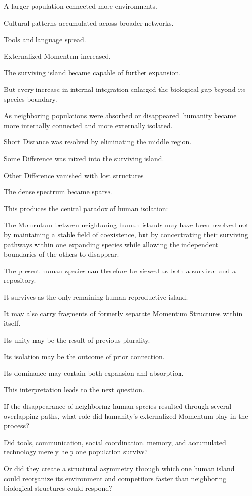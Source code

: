 A larger population connected more environments.

Cultural patterns accumulated across broader networks.

Tools and language spread.

Externalized Momentum increased.

The surviving island became capable of further expansion.

But every increase in internal integration enlarged the biological gap beyond its species boundary.

As neighboring populations were absorbed or disappeared, humanity became more internally connected and more externally isolated.

Short Distance was resolved by eliminating the middle region.

Some Difference was mixed into the surviving island.

Other Difference vanished with lost structures.

The dense spectrum became sparse.

This produces the central paradox of human isolation:

The Momentum between neighboring human islands may have been resolved not by maintaining a stable field of coexistence, but by concentrating their surviving pathways within one expanding species while allowing the independent boundaries of the others to disappear.

The present human species can therefore be viewed as both a survivor and a repository.

It survives as the only remaining human reproductive island.

It may also carry fragments of formerly separate Momentum Structures within itself.

Its unity may be the result of previous plurality.

Its isolation may be the outcome of prior connection.

Its dominance may contain both expansion and absorption.

This interpretation leads to the next question.

If the disappearance of neighboring human species resulted through several overlapping paths, what role did humanity’s externalized Momentum play in the process?

Did tools, communication, social coordination, memory, and accumulated technology merely help one population survive?

Or did they create a structural asymmetry through which one human island could reorganize its environment and competitors faster than neighboring biological structures could respond?

